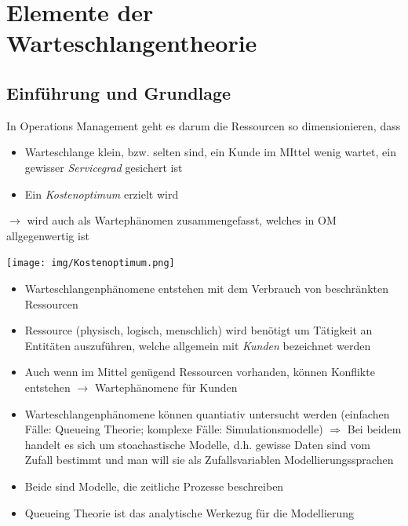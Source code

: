 \documentclass{report}
\newenvironment{Figure}
	{\par\medskip\noindent\minipage{\linewidth}}
	{\endminipage\par\medskip}
\theoremstyle{definition}
\theoremstyle{example}
\begin{document}
\chapter{Elemente der Warteschlangentheorie}

\section{Einführung und Grundlage}
In Operations Management geht es darum die Ressourcen so dimensionieren, dass
\begin{itemize}
   \item Warteschlange klein, bzw. selten sind, ein Kunde im MIttel wenig wartet, ein gewisser \textit{Servicegrad} gesichert ist
   \item Ein \textit{Kostenoptimum} erzielt wird
\end{itemize}
$\rightarrow$ wird auch als Wartephänomen zusammengefasst, welches in OM allgegenwertig ist

\begin{Figure}
\centering
\texttt{[image: img/Kostenoptimum.png]}
	\label{fig:Abbildung eines Kostenoptimum}
\end{Figure}

\begin{itemize}
   \item Warteschlangenphänomene entstehen mit dem Verbrauch von beschränkten Ressourcen
   \item Ressource (physisch, logisch, menschlich) wird benötigt um Tätigkeit an Entitäten auszuführen, welche allgemein mit \textit{Kunden} bezeichnet werden
   \item Auch wenn im Mittel genügend Ressourcen vorhanden, können Konflikte entstehen $\rightarrow$ Wartephänomene für Kunden
   \item Warteschlangenphänomene können quantiativ untersucht werden (einfachen Fälle: Queueing Theorie; komplexe Fälle: Simulationsmodelle) $\Rightarrow$ Bei beidem handelt es sich um stoachastische Modelle, d.h. gewisse Daten sind vom Zufall bestimmt und man will sie als Zufallsvariablen Modellierungssprachen
   \item Beide sind Modelle, die zeitliche Prozesse beschreiben 
   \item Queueing Theorie ist das analytische Werkezug für die Modellierung
\end{itemize}
\end{document}
